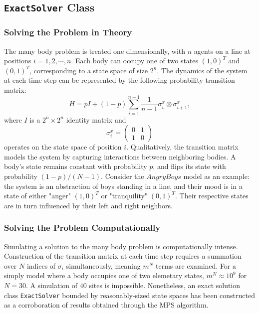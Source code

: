 \documentclass[english]{article}
\begin{document}
\subsection{\texttt{ExactSolver} Class}

\subsubsection{Solving the Problem in Theory}
	The many body problem is treated one dimensionally, with $n$ agents on a line at positions $i=1,2,\cdots,n$. Each body can occupy one of two states $(1,0)^T$ and $(0,1)^T$, corresponding to a state space of size $2^n$. The dynamics of the system at each time step can be represented by the following probability transition matrix:
\begin{displaymath}
H = pI + (1-p)\sum_{i=1}^{n-1}\frac{1}{n-1}\sigma_i^x\otimes\sigma_{i+1}^x,
\end{displaymath}
where $I$ is a $2^n\times2^n$ identity matrix and
\begin{displaymath}
\sigma_i^x =
\begin{pmatrix}
0 & 1 \\
1 & 0
\end{pmatrix}
\end{displaymath}
operates on the state space of position $i$.  Qualitatively, the transition matrix models the system by capturing interactions between neighboring bodies. A body's state remains constant with probability $p$, and flips its state with probability  $(1-p)/(N-1)$. Consider the $Angry Boys$ model as an example: the system is an abstraction of boys standing in a line, and their mood is in a state of either  "anger" $(1,0)^T$ or "tranquility" $(0,1)^T$. Their respective states are in turn influenced by their left and right neighbors.

\subsubsection{Solving the Problem Computationally}
	Simulating a solution to the many body problem is computationally intense. Construction of the transition matrix at each time step requires a summation over $N$ indices of $\sigma_{i}$
simultaneously, meaning $m^{N}$ terms are examined. For a simply model where a body occupies one of two elemetary states, $m^{N}\approx10^{9}$ for $N=30$. A simulation of $40$ sites is impossible.  Nonetheless, an exact solution class \texttt{ExactSolver} bounded by reasonably-sized state spaces has been constructed as a corroboration of results obtained through the MPS algorithm.
\end{document}
